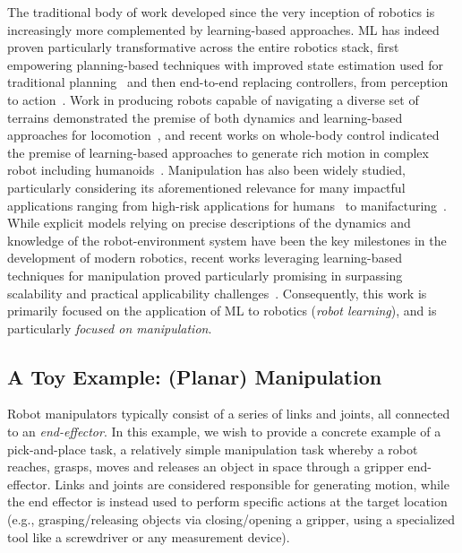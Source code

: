 The traditional body of work developed since the very inception of robotics is increasingly more complemented by learning-based approaches.
ML has indeed proven particularly transformative across the entire robotics stack, first empowering planning-based techniques with improved state estimation used for traditional planning~\citep{tangPerceptionNavigationAutonomous2023} and then end-to-end replacing controllers, from perception to action~\citep{koberReinforcementLearningRobotics}.
Work in producing robots capable of navigating a diverse set of terrains demonstrated the premise of both dynamics and learning-based approaches for locomotion~\citep{griffinWalkingStabilizationUsing2017,jiDribbleBotDynamicLegged2023,leeLearningQuadrupedalLocomotion2020,margolisRapidLocomotionReinforcement2022}, and recent works on whole-body control indicated the premise of learning-based approaches to generate rich motion in complex robot including humanoids~\citep{zhangWoCoCoLearningWholeBody2024,nvidiaGR00TN1Open2025}.
Manipulation has also been widely studied, particularly considering its aforementioned relevance for many impactful applications ranging from high-risk applications for humans~\citep{fujitaDevelopmentRobotsNuclear2020,alizadehComprehensiveSurveySpace2024,fujitaDevelopmentRobotsNuclear2020} to manifacturing~\citep{sannemanStateIndustrialRobotics2020}.
While explicit models relying on precise descriptions of the dynamics and knowledge of the robot-environment system have been the key milestones in the development of modern robotics, recent works leveraging learning-based techniques for manipulation proved particularly promising in surpassing scalability and practical applicability challenges~\citep{koberReinforcementLearningRobotics}.
Consequently, this work is primarily focused on the application of ML to robotics (\emph{robot learning}), and is particularly \emph{focused on manipulation}.

\subsection{A Toy Example: (Planar) Manipulation}
Robot manipulators typically consist of a series of links and joints, all connected to an \emph{end-effector}.
In this example, we wish to provide a concrete example of a pick-and-place task, a relatively simple manipulation task whereby a robot reaches, grasps, moves and releases an object in space through a gripper end-effector.
Links and joints are considered responsible for generating motion, while the end effector is instead used to perform specific actions at the target location (e.g., grasping/releasing objects via closing/opening a gripper, using a specialized tool like a screwdriver or any measurement device).

